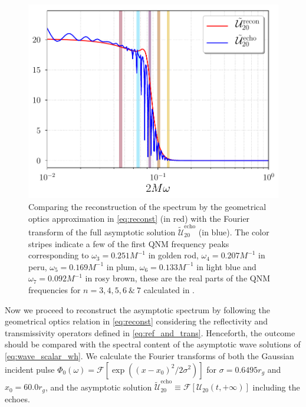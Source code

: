 \documentclass[article,aps,nofootinbib,twocolumn,superscriptaddress]{revtex4-1}
\begin{document}
\begin{figure}[t!]
\centering
\includegraphics[width=.45\textwidth]{figures/Reconst_omega_scalar.pdf}
\caption{\label{fig:rec_scalar} Comparing the reconstruction of the spectrum by the geometrical optics approximation in \eqref{eq:reconst} (in red) with the Fourier transform of the full asymptotic solution $\tilde{\mathcal{U}}_{20}^{\mathrm{echo}}$ (in blue). The color stripes indicate a few of the first QNM frequency peaks corresponding to $\omega_3=0.251M^{-1}$ in golden rod, $\omega_4=0.207M^{-1}$ in peru, $\omega_5=0.169M^{-1}$ in plum, $\omega_6=0.133M^{-1}$ in light blue and $\omega_7=0.092M^{-1}$ in rosy brown, these are the real parts of the QNM frequencies for $n=3,4,5,6~\&~7$ calculated in \citep{PhysRevD.46.4179}.}
\end{figure} 

Now we proceed to reconstruct the asymptotic spectrum by following the geometrical optics relation in \eqref{eq:reconst} considering the reflectivity and transmissivity operators defined in \eqref{eq:ref_and_trans}. Henceforth, the outcome should be compared with the spectral content of the asymptotic wave solutions of \eqref{eq:wave_scalar_wh}. We calculate the Fourier transforms of both the Gaussian incident pulse $\Phi_0(\omega)=\mathcal{F}[\exp\left((x-x_0)^2/2\sigma^2\right)]$ for $\sigma=0.6495r_g$ and $x_0=60.0r_g$, and the asymptotic solution $\tilde{\mathcal{U}}_{20}^{\mathrm{echo}}\equiv\mathcal{F}[\mathcal{U}_{20}(t,+\infty)]$ including the echoes.\\
\end{document}
